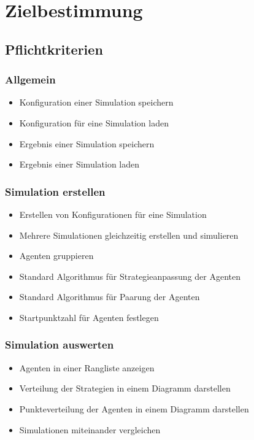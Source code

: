 \section{Zielbestimmung}

\subsection{Pflichtkriterien}

\subsubsection{Allgemein}

\begin{itemize}
\item Konfiguration einer Simulation speichern
\item Konfiguration für eine Simulation laden
\item Ergebnis einer Simulation speichern
\item Ergebnis einer Simulation laden
\end{itemize}

\subsubsection{Simulation erstellen}

\begin{itemize}
\item Erstellen von Konfigurationen für eine Simulation
\item Mehrere Simulationen gleichzeitig erstellen und simulieren
\item Agenten gruppieren
\item Standard Algorithmus für Strategieanpassung der Agenten
\item Standard Algorithmus für Paarung der Agenten 
\item Startpunktzahl für Agenten festlegen
\end{itemize}

\subsubsection{Simulation auswerten}
\begin{itemize}
\item Agenten in einer Rangliste anzeigen
\item Verteilung der Strategien in einem Diagramm darstellen
\item Punkteverteilung der Agenten in einem Diagramm darstellen
\item Simulationen miteinander vergleichen
\end{itemize}

